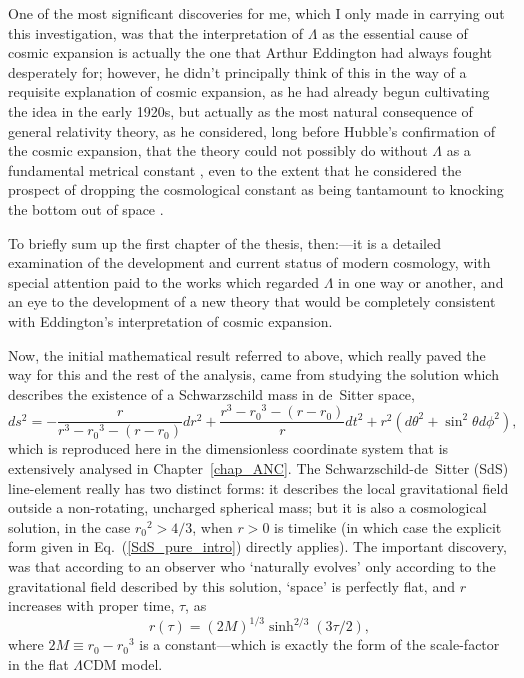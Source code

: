 One of the most significant discoveries for me, which I only made in carrying out this investigation, was that the interpretation of $\Lambda$ as the essential cause of cosmic expansion is actually the one that Arthur Eddington had always fought desperately for; however, he didn't principally think of this in the way of a requisite explanation of cosmic expansion, as he had already begun cultivating the idea in the early 1920s, but actually as the most natural consequence of general relativity theory, as he considered, long before Hubble's confirmation of the cosmic expansion, that the theory could not possibly do without $\Lambda$ as a fundamental metrical constant \cite{Eddington1923}, even to the extent that he considered the prospect of dropping the cosmological constant as being tantamount to knocking the bottom out of space \cite{Eddington1933}.

To briefly sum up the first chapter of the thesis, then:---it is a detailed examination of the development and current status of modern cosmology, with special attention paid to the works which regarded $\Lambda$ in one way or another, and an eye to the development of a new theory that would be completely consistent with Eddington's interpretation of cosmic expansion.

Now, the initial mathematical result referred to above, which really paved the way for this and the rest of the analysis, came from studying the solution which describes the existence of a Schwarzschild mass in de~Sitter space, 
\begin{equation}
ds^2=-\frac{r}{r^3-{r_0}^3-(r-r_0)}dr^2+\frac{r^3-{r_0}^3-(r-r_0)}{r}dt^2+r^2(d\theta^2+\sin^2\theta{d\phi^2}),\label{SdS_pure_intro}
\end{equation}
which is reproduced here in the dimensionless coordinate system that is extensively analysed in Chapter~\ref{chap_ANC}. The Schwarzschild-de~Sitter (SdS) line-element really has two distinct forms: it describes the local gravitational field outside a non-rotating, uncharged spherical mass; but it is also a cosmological solution, in the case ${r_0}^2>4/3$, when $r>0$ is timelike (in which case the explicit form given in Eq.~(\ref{SdS_pure_intro}) directly applies). The important discovery, was that according to an observer who `naturally evolves' only according to the gravitational field described by this solution, `space' is perfectly flat, and $r$ increases with proper time, $\tau$, as
\begin{equation}
r(\tau)=(2M)^{1/3}\sinh^{2/3}\left(3\tau/2\right),\label{SdS_scalefac_intro}
\end{equation}
where $2M\equiv{r_0}-{r_0}^3$ is a constant---which is exactly the form of the scale-factor in the flat $\Lambda$CDM model.


